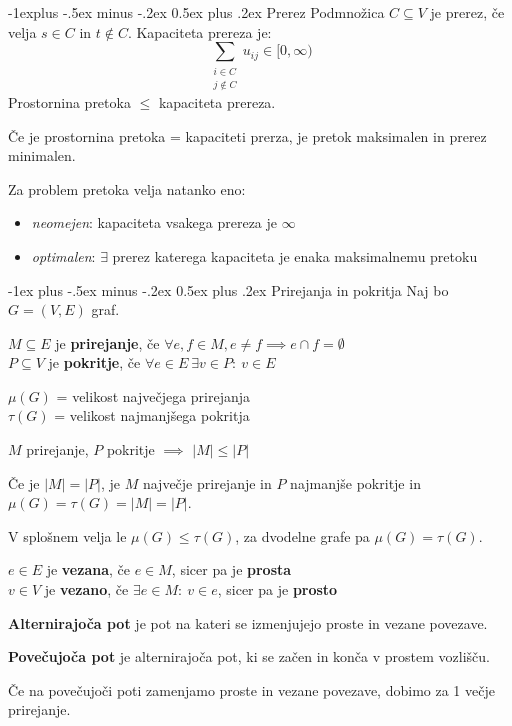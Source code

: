 \documentclass[a4paper,8pt]{extarticle}
\makeatletter
\renewcommand{\section}{\@startsection{section}{1}{0mm}%
                                {-1ex plus -.5ex minus -.2ex}%
                                {0.5ex plus .2ex}%
                                {\normalfont\large\bfseries}}
\renewcommand{\subsection}{\@startsection{subsection}{2}{0mm}%
                                {-1explus -.5ex minus -.2ex}%
                                {0.5ex plus .2ex}%
                                {\normalfont\normalsize\bfseries}}
\makeatother
\begin{document}
\begin{multicols}{4}
\subsection{Prerez}
Podmnožica $C \subseteq V$ je prerez, če velja $s \in C$ in $t \notin C$. Kapaciteta prereza je:
\[ \sum_{\substack{i \in C \\ j \notin C}} u_{ij} \in [0,\infty) \]
Prostornina pretoka $\leq$ kapaciteta prereza.

Če je prostornina pretoka = kapaciteti prerza, je pretok maksimalen in prerez minimalen.

Za problem pretoka velja natanko eno:
\begin{itemize}
	\item \emph{neomejen}: kapaciteta vsakega prereza je $\infty$
	\item \emph{optimalen}: $\exists$ prerez katerega kapaciteta je enaka maksimalnemu pretoku
\end{itemize}

\section{Prirejanja in pokritja}
Naj bo $G = (V, E)$ graf.

$M \subseteq E$ je \textbf{prirejanje}, če $\forall e, f \in M, e \neq f \implies e \cap f = \emptyset$ \\
$P \subseteq V$ je \textbf{pokritje}, če $\forall e \in E\ \exists v \in P:\ v \in E$

$\mu(G)$ = velikost največjega prirejanja \\
$\tau(G)$ = velikost najmanjšega pokritja

$M$ prirejanje, $P$ pokritje $\implies$ $|M| \leq |P|$

Če je $|M| = |P|$, je $M$ največje prirejanje in $P$ najmanjše pokritje in $\mu(G) = \tau(G) = |M| = |P|$.

V splošnem velja le $\mu(G) \leq \tau(G)$, za dvodelne grafe pa $\mu(G) = \tau(G)$.

$e \in E$ je \textbf{vezana}, če $e \in M$, sicer pa je \textbf{prosta}\\
$v \in V$ je \textbf{vezano}, če $\exists e \in M:\ v \in e$, sicer pa je \textbf{prosto}

\textbf{Alternirajoča pot} je pot na kateri se izmenjujejo proste in vezane povezave.

\textbf{Povečujoča pot} je alternirajoča pot, ki se začen in konča v prostem vozlišču.

Če na povečujoči poti zamenjamo proste in vezane povezave, dobimo za 1 večje prirejanje.


\end{multicols}
\end{document}
